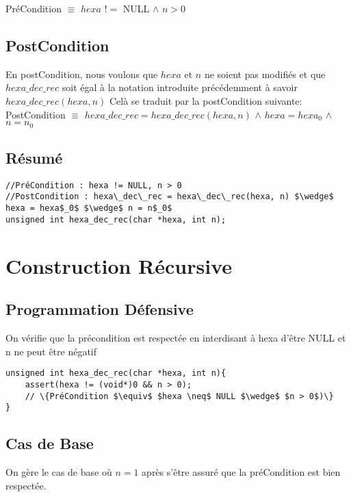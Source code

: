 \documentclass[a4paper, 11pt, oneside]{article}
\begin{document}
PréCondition $\equiv$ $hexa$ $!=$ NULL $\wedge$ $n > 0$

\subsection{PostCondition}
En postCondition, nous voulons que $hexa$ et $n$ ne soient pas modifiés et que $hexa\_dec\_rec$ soit égal à la notation introduite précédemment à savoir $hexa\_dec\_rec(hexa, n)$
Celà se traduit par la postCondition suivante:\\

PostCondition $\equiv$ $hexa\_dec\_rec = hexa\_dec\_rec(hexa, n)$ $\wedge$ $hexa = hexa_0$ $\wedge$ $n = n_0$

\subsection{Résumé}

\begin{lstlisting}
//PréCondition : hexa != NULL, n > 0
//PostCondition : hexa\_dec\_rec = hexa\_dec\_rec(hexa, n) $\wedge$ hexa = hexa$_0$ $\wedge$ n = n$_0$
unsigned int hexa_dec_rec(char *hexa, int n);
\end{lstlisting}

\section{Construction Récursive}\label{recur}
%
%

\subsection{Programmation Défensive}
On vérifie que la précondition est respectée en interdisant à hexa d'être NULL et n ne peut être négatif

\begin{lstlisting}
unsigned int hexa_dec_rec(char *hexa, int n){
    assert(hexa != (void*)0 && n > 0);
    // \{PréCondition $\equiv$ $hexa \neq$ NULL $\wedge$ $n > 0$)\}
}
\end{lstlisting}

\newpage

\subsection{Cas de Base}
On gère le cas de base où $n = 1$ après s'être assuré que la préCondition est bien respectée.
\end{document}
